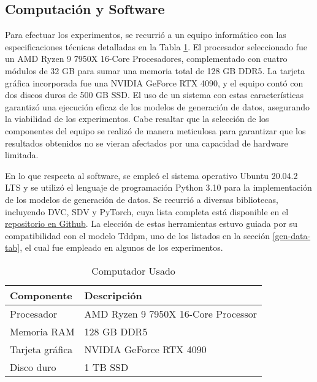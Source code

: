 \subsection{Computación y Software}
\label{subsec:computacion}
Para efectuar los experimentos, se recurrió a un equipo informático con las especificaciones técnicas detalladas en la Tabla \ref{tabla-componentes-pc}. El procesador seleccionado fue un AMD Ryzen 9 7950X 16-Core Procesadores, complementado con cuatro módulos de 32 GB para sumar una memoria total de 128 GB DDR5. La tarjeta gráfica incorporada fue una NVIDIA GeForce RTX 4090, y el equipo contó con dos discos duros de 500 GB SSD. El uso de un sistema con estas características garantizó una ejecución eficaz de los modelos de generación de datos, asegurando la viabilidad de los experimentos. Cabe resaltar que la selección de los componentes del equipo se realizó de manera meticulosa para garantizar que los resultados obtenidos no se vieran afectados por una capacidad de hardware limitada.

En lo que respecta al software, se empleó el sistema operativo Ubuntu 20.04.2 LTS y se utilizó el lenguaje de programación Python 3.10 para la implementación de los modelos de generación de datos. Se recurrió a diversas bibliotecas, incluyendo DVC, SDV y PyTorch, cuya lista completa está disponible en el \href{https://github.com/gvillarroel/synthetic-data-for-text/blob/main/freeze.txt}{repositorio en Github}. La elección de estas herramientas estuvo guiada por su compatibilidad con el modelo Tddpm, uno de los listados en la sección \ref{gen-data-tab}, el cual fue empleado en algunos de los experimentos.


\begin{table}[H]
	\centering
	\caption{Computador Usado}
	\label{tabla-componentes-pc}
    \begin{tabular}{|l|l|}
        \hline
        \rowcolor[gray]{0.8}
        Componente & Descripción \\
        \hline
        Procesador & AMD Ryzen 9 7950X 16-Core Processor \\
        \hline
        Memoria RAM & 128 GB DDR5 \\
        \hline
        Tarjeta gráfica & NVIDIA GeForce RTX 4090 \\
        \hline
        Disco duro & 1 TB SSD \\
        \hline
      \end{tabular}        
\end{table}  


